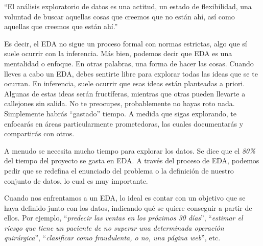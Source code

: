 \documentclass[
  letterpaper,
  DIV=11,
  numbers=noendperiod]{scrreprt}
\begin{document}
\begin{tcolorbox}[enhanced jigsaw, arc=.35mm, breakable, coltitle=black, left=2mm, opacityback=0, bottomtitle=1mm, colbacktitle=quarto-callout-tip-color!10!white, title=\textcolor{quarto-callout-tip-color}{\faLightbulb}\hspace{0.5em}{John Tukey}, titlerule=0mm, colback=white, colframe=quarto-callout-tip-color-frame, bottomrule=.15mm, rightrule=.15mm, opacitybacktitle=0.6, toptitle=1mm, toprule=.15mm, leftrule=.75mm]

``El análisis exploratorio de datos es una actitud, un estado de
flexibilidad, una voluntad de buscar aquellas cosas que creemos que no
están ahí, así como aquellas que creemos que están ahí.''

\end{tcolorbox}

Es decir, el EDA no sigue un proceso formal con normas estrictas, algo
que sí suele ocurrir con la inferencia. Más bien, podemos decir que EDA
es una mentalidad o enfoque. En otras palabras, una forma de hacer las
cosas. Cuando lleves a cabo un EDA, debes sentirte libre para explorar
todas las ideas que se te ocurran. En inferencia, suele ocurrir que esas
ideas están planteadas a priori. Algunas de estas ideas serán
fructíferas, mientras que otras pueden llevarte a callejones sin salida.
No te preocupes, probablemente no hayas roto nada. Simplemente habrás
``gastado'' tiempo. A medida que sigas explorando, te enfocarás en áreas
particularmente prometedoras, las cuales documentarás y compartirás con
otros.

A menudo se necesita mucho tiempo para explorar los datos. Se dice que
el \emph{80\%} del tiempo del proyecto se gasta en EDA. A través del
proceso de EDA, podemos pedir que se redefina el enunciado del problema
o la definición de nuestro conjunto de datos, lo cual es muy importante.

\begin{tcolorbox}[enhanced jigsaw, arc=.35mm, breakable, coltitle=black, left=2mm, opacityback=0, bottomtitle=1mm, colbacktitle=quarto-callout-important-color!10!white, title=\textcolor{quarto-callout-important-color}{\faExclamation}\hspace{0.5em}{Para recordar}, titlerule=0mm, colback=white, colframe=quarto-callout-important-color-frame, bottomrule=.15mm, rightrule=.15mm, opacitybacktitle=0.6, toptitle=1mm, toprule=.15mm, leftrule=.75mm]

Cuando nos enfrentamos a un EDA, lo ideal es contar con un objetivo que
se haya definido junto con los datos, indicando qué se quiere conseguir
a partir de ellos. Por ejemplo, ``\emph{predecir las ventas en los
próximos 30 días}'', ``\emph{estimar el riesgo que tiene un paciente de
no superar una determinada operación quirúrgica}'', ``\emph{clasificar
como fraudulenta, o no, una página web}'', etc.

\end{tcolorbox}
\end{document}

